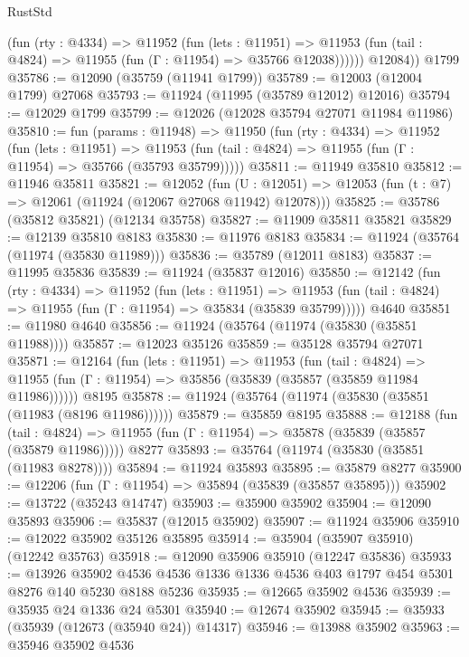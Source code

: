 \begin{lexlean}{RustStd}
\begin{coremodule}
{\begin{coremodule}
{{{{{{{{{{{{{{{{{{{{{{{{{{{{{{{{{{{{{{{{{{{{{{{{{{{{{{{{{{{{{{{{{{{{{{{{{{{{{{{{            (fun (rty : @4334) =>
            @11952
              (fun (lets : @11951) =>
              @11953 (fun (tail : @4824) => @11955 (fun (Γ : @11954) => @35766 @12038))))))
        @12084))
    @1799
@35786 := @12090 (@35759 (@11941 @1799))
@35789 := @12003 (@12004 @1799) @27068
@35793 := @11924 (@11995 (@35789 @12012) @12016)
@35794 := @12029 @1799
@35799 := @12026 (@12028 @35794 @27071 @11984 @11986)
@35810 := fun (params : @11948) =>
  @11950
    (fun (rty : @4334) =>
    @11952
      (fun (lets : @11951) =>
      @11953 (fun (tail : @4824) => @11955 (fun (Γ : @11954) => @35766 (@35793 @35799)))))
@35811 := @11949 @35810
@35812 := @11946 @35811
@35821 := @12052
    (fun (U : @12051) => @12053 (fun (t : @7) => @12061 (@11924 (@12067 @27068 @11942) @12078)))
@35825 := @35786 (@35812 @35821) (@12134 @35758)
@35827 := @11909 @35811 @35821
@35829 := @12139 @35810 @8183
@35830 := @11976 @8183
@35834 := @11924 (@35764 (@11974 (@35830 @11989)))
@35836 := @35789 (@12011 @8183)
@35837 := @11995 @35836
@35839 := @11924 (@35837 @12016)
@35850 := @12142
    (fun (rty : @4334) =>
    @11952
      (fun (lets : @11951) =>
      @11953 (fun (tail : @4824) => @11955 (fun (Γ : @11954) => @35834 (@35839 @35799)))))
    @4640
@35851 := @11980 @4640
@35856 := @11924 (@35764 (@11974 (@35830 (@35851 @11988))))
@35857 := @12023 @35126
@35859 := @35128 @35794 @27071
@35871 := @12164
    (fun (lets : @11951) =>
    @11953
      (fun (tail : @4824) =>
      @11955 (fun (Γ : @11954) => @35856 (@35839 (@35857 (@35859 @11984 @11986))))))
    @8195
@35878 := @11924 (@35764 (@11974 (@35830 (@35851 (@11983 (@8196 @11986))))))
@35879 := @35859 @8195
@35888 := @12188
    (fun (tail : @4824) => @11955 (fun (Γ : @11954) => @35878 (@35839 (@35857 (@35879 @11986)))))
    @8277
@35893 := @35764 (@11974 (@35830 (@35851 (@11983 @8278))))
@35894 := @11924 @35893
@35895 := @35879 @8277
@35900 := @12206 (fun (Γ : @11954) => @35894 (@35839 (@35857 @35895)))
@35902 := @13722 (@35243 @14747)
@35903 := @35900 @35902
@35904 := @12090 @35893
@35906 := @35837 (@12015 @35902)
@35907 := @11924 @35906
@35910 := @12022 @35902 @35126 @35895
@35914 := @35904 (@35907 @35910) (@12242 @35763)
@35918 := @12090 @35906 @35910 (@12247 @35836)
@35933 := @13926
    @35902
    @4536
    @4536
    @1336
    @1336
    @4536
    @403
    @1797
    @454
    @5301
    @8276
    @140
    @5230
    @8188
    @5236
@35935 := @12665 @35902 @4536
@35939 := @35935 @24 @1336 @24 @5301
@35940 := @12674 @35902
@35945 := @35933 (@35939 (@12673 (@35940 @24)) @14317)
@35946 := @13988 @35902
@35963 := @35946
    @35902
    @4536
}}}}}}}}}}}}}}}}}}}}}}}}}}}}}}}}}}}}}}}}}}}}}}}}}}}}}}}}}}}}}}}}}}}}}}}}}}}}}}}}
\end{coremodule}}
\end{coremodule}
\end{lexlean}
